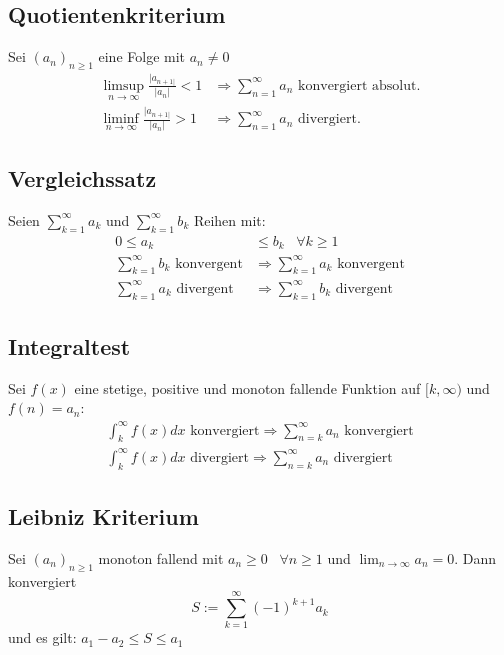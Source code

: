 \documentclass[8pt]{extarticle}
\begin{document}
\begin{multicols*}{3}
\subsection{Quotientenkriterium}

Sei $(a_n)_{n \geq 1}$ eine Folge mit $a_n \neq 0$
\begin{align*}
  \limsup_{n \rightarrow \infty} \frac{|a_{n+1|}}{|a_n|} < 1 &\Rightarrow \sum_{n = 1}^\infty a_n \text{ konvergiert absolut.}\\
  \liminf_{n \rightarrow \infty} \frac{|a_{n+1|}}{|a_n|} > 1 &\Rightarrow \sum_{n = 1}^\infty a_n \text{ divergiert.}
\end{align*}

\subsection{Vergleichssatz}

Seien $\sum_{k = 1}^\infty a_k$ und $\sum_{k = 1}^\infty b_k$ Reihen mit:
\begin{align*}
  0 \leq a_k &\leq b_k \; \; \; \forall k \geq 1\\
  \sum_{k = 1}^\infty b_k \text{ konvergent} &\Rightarrow \sum_{k = 1}^\infty a_k \text{ konvergent}\\
  \sum_{k = 1}^\infty a_k \text{ divergent} &\Rightarrow \sum_{k = 1}^\infty b_k \text{ divergent}
\end{align*}
\subsection{Integraltest}

Sei $f(x)$ eine stetige, positive und monoton fallende
Funktion auf $[k, \infty)$ und $f(n) = a_n$:
\begin{align*}
\int_{k}^{\infty} f(x) dx \text{ konvergiert} \Rightarrow \sum_{n = k}^{\infty} a_n \text{ konvergiert}\\
\int_{k}^{\infty} f(x) dx \text{ divergiert}  \Rightarrow \sum_{n = k}^{\infty} a_n \text{ divergiert}
\end{align*}

\subsection{Leibniz Kriterium}

Sei $(a_n)_{n \geq 1}$ monoton fallend mit $a_n \geq 0 \; \; \; \forall n \geq 1$ und
$\lim_{n \rightarrow \infty} a_n = 0$. Dann konvergiert
$$
  S := \sum_{k = 1}^\infty (-1)^{k + 1} a_k
$$
und es gilt: $a_1 - a_2 \leq S \leq a_1$


\end{multicols*}
\end{document}
